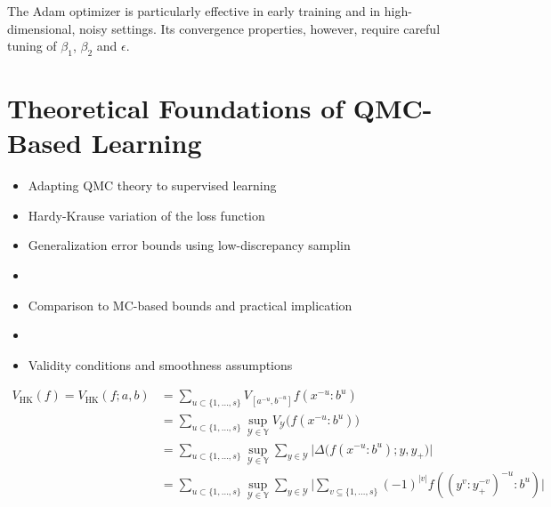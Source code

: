 \begin{remark}
The Adam optimizer is particularly effective in early training and in
high-dimensional, noisy settings. Its convergence properties, however, require
careful tuning of $\beta_1$, $\beta_2$ and $\epsilon$.
\end{remark}




































\chapter{Theoretical Foundations of QMC-Based Learning}
\label{chapter5}

\begin{itemize}
    \item Adapting QMC theory to supervised learning
    \item Hardy-Krause variation of the loss function
    \item Generalization error bounds using low-discrepancy samplin\item 
    \item Comparison to MC-based bounds and practical implication\item 
    \item Validity conditions and smoothness assumptions
\end{itemize}

\begin{align*}
    V_{\mathrm{HK}}(f) = V_{\mathrm{HK}}(f; a, b) &= \sum_{u\subset \{1,\dots,s\}} V_{[a^{-u}, b^{-u}]} f(x^{-u}:b^u) \\
    &= \sum_{u\subset \{1,\dots,s\}} \sup_{\mathcal{Y} \in \mathbb{Y}} V_\mathcal{Y} \big( f(x^{-u} : b^u) \big) \\
    &= \sum_{u\subset \{1,\dots,s\}} \sup_{\mathcal{Y} \in \mathbb{Y}} \sum_{y\in\mathcal{Y}} \big| \Delta\big( f(x^{-u} : b^u); y, y_+ \big) \big| \\
    &= \sum_{u\subset \{1,\dots,s\}} \sup_{\mathcal{Y} \in \mathbb{Y}} \sum_{y\in\mathcal{Y}} \big| \sum_{v\subseteq \{1,\dots,s\}} (-1)^{|v|} f((y^v:y_+^{-v})^{-u}:b^{u}) \big| \\
\end{align*}

